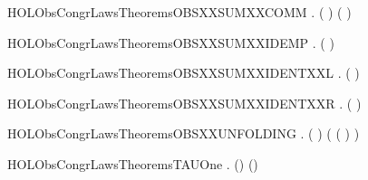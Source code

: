 \begin{SaveVerbatim}{HOLObsCongrLawsTheoremsOBSXXSUMXXCOMM}
\HOLTokenTurnstile{} \HOLSymConst{\HOLTokenForall{}} .  ( \HOLSymConst{+} ) ( \HOLSymConst{+} )
\end{SaveVerbatim}
\newcommand{\HOLObsCongrLawsTheoremsOBSXXSUMXXCOMM}{\UseVerbatim{HOLObsCongrLawsTheoremsOBSXXSUMXXCOMM}}
\begin{SaveVerbatim}{HOLObsCongrLawsTheoremsOBSXXSUMXXIDEMP}
\HOLTokenTurnstile{} \HOLSymConst{\HOLTokenForall{}}.  ( \HOLSymConst{+} ) 
\end{SaveVerbatim}
\newcommand{\HOLObsCongrLawsTheoremsOBSXXSUMXXIDEMP}{\UseVerbatim{HOLObsCongrLawsTheoremsOBSXXSUMXXIDEMP}}
\begin{SaveVerbatim}{HOLObsCongrLawsTheoremsOBSXXSUMXXIDENTXXL}
\HOLTokenTurnstile{} \HOLSymConst{\HOLTokenForall{}}.  ( \HOLSymConst{+} ) 
\end{SaveVerbatim}
\newcommand{\HOLObsCongrLawsTheoremsOBSXXSUMXXIDENTXXL}{\UseVerbatim{HOLObsCongrLawsTheoremsOBSXXSUMXXIDENTXXL}}
\begin{SaveVerbatim}{HOLObsCongrLawsTheoremsOBSXXSUMXXIDENTXXR}
\HOLTokenTurnstile{} \HOLSymConst{\HOLTokenForall{}}.  ( \HOLSymConst{+} ) 
\end{SaveVerbatim}
\newcommand{\HOLObsCongrLawsTheoremsOBSXXSUMXXIDENTXXR}{\UseVerbatim{HOLObsCongrLawsTheoremsOBSXXSUMXXIDENTXXR}}
\begin{SaveVerbatim}{HOLObsCongrLawsTheoremsOBSXXUNFOLDING}
\HOLTokenTurnstile{} \HOLSymConst{\HOLTokenForall{}} .  (  ) (  (  ) )
\end{SaveVerbatim}
\newcommand{\HOLObsCongrLawsTheoremsOBSXXUNFOLDING}{\UseVerbatim{HOLObsCongrLawsTheoremsOBSXXUNFOLDING}}
\begin{SaveVerbatim}{HOLObsCongrLawsTheoremsTAUOne}
\HOLTokenTurnstile{} \HOLSymConst{\HOLTokenForall{}} .  (\HOLConst{\ensuremath{\tau}}) ()
\end{SaveVerbatim}
